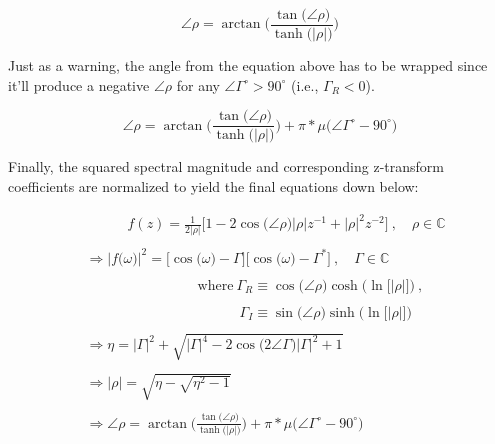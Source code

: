\documentclass{article}
\begin{document}
\begin{equation*}
    \angle{\rho} = \arctan\Bigg( \frac{\tan\big(\angle{\rho}\big)}{\tanh\big(\big|\rho\big|\big)} \Bigg)
  \end{equation*}\newline

Just as a warning, the angle from the equation above has to be wrapped since it'll produce a negative $\angle{\rho}$ for any $\angle{\Gamma}^{\circ} > 90^{\circ}$ (i.e., $\Gamma_{R} < 0$).

\begin{equation*}
    \angle{\rho} = \arctan\Bigg( \frac{\tan\big(\angle{\rho}\big)}{\tanh\big(\big|\rho\big|\big)} \Bigg) + \pi * \mu\Big(\angle{\Gamma}^{\circ} - 90^{\circ}\Big)
  \end{equation*}\newline

Finally, the squared spectral magnitude and corresponding z-transform coefficients are normalized to yield the final equations down below: 

\begin{align*}
    & \quad \quad \quad f(z) = \frac{1}{2\big|\rho\big|}\bigg[1 - 2\cos\big(\angle{\rho}\big)\big|\rho\big|z^{-1} + \big|\rho\big|^{2}z^{-2}\bigg] \ , \quad \rho \in \mathbb{C} \\ \\
    & \Rightarrow \Big|f\big(\omega\big)\Big|^{2} = \Big[\cos\big(\omega\big) - \Gamma\Big]\Big[\cos\big(\omega\big) - \Gamma^{*}\Big] \ , \quad \Gamma \in \mathbb{C} \\ \\ 
    & \quad \quad \quad \quad \quad \quad \quad \quad \text{where} \ \Gamma_{R} \equiv \cos\big(\angle{\rho}\big)\cosh\Big(\ln\big[\big|\rho\big|\big]\Big) \ , \\ \\  
    & \quad \quad \quad \quad \quad \quad \quad \quad \quad \quad \quad \Gamma_{I} \equiv \sin\big(\angle{\rho}\big)\sinh\Big(\ln\big[\big|\rho\big|\big]\Big) \\ \\
    & \Rightarrow \eta = \big|\Gamma\big|^{2} + \sqrt{\big|\Gamma\big|^{4} - 2\cos\big(2\angle{\Gamma}\big)|\Gamma|^{2} + 1} \\ \\
    & \Rightarrow \big|\rho\Big| = \sqrt{\eta - \sqrt{\eta^{2} - 1}} \\ \\
    & \Rightarrow \angle{\rho} = \arctan\Bigg( \frac{\tan\big(\angle{\rho}\big)}{\tanh\big(\big|\rho\big|\big)} \Bigg) + \pi * \mu\Big(\angle{\Gamma}^{\circ} - 90^{\circ}\Big)
  \end{align*}
\end{document}
